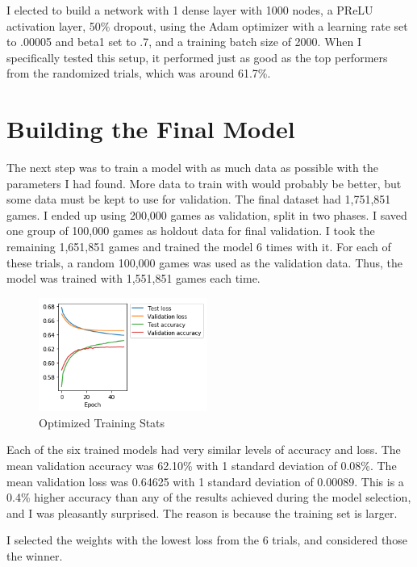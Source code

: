 \documentclass[twoside,twocolumn]{article}
\begin{document}
I elected to build a network with 1 dense layer with 1000 nodes, a PReLU activation layer,  50\% dropout, using the Adam optimizer with a learning rate set to .00005 and beta1 set to .7, and a training batch size of 2000.  When I specifically tested this setup, it performed just as good as the top performers from the randomized trials, which was around 61.7\%.

\section {Building the Final Model}

The next step was to train a model with as much data as possible with the parameters I had found.  More data to train with would probably be better, but some data must be kept to use for validation.  The final dataset had 1,751,851 games.  I ended up using 200,000 games as validation, split in two phases.  I saved one group of 100,000 games as holdout data for final validation.  I took the remaining 1,651,851 games and trained the model 6 times with it.  For each of these trials, a random 100,000 games was used as the validation data.  Thus, the model was trained with 1,551,851 games each time.

\begin{figure}
\caption{Optimized Training Stats}
\label{figure:training}
\begin{adjustbox}{center}
\includegraphics[width=157pt]{training}
\end{adjustbox}
\centering
\end{figure}

Each of the six trained models had very similar levels of accuracy and loss.  The mean validation accuracy was 62.10\% with 1 standard deviation of 0.08\%.  The mean validation loss was  0.64625 with 1 standard deviation of 0.00089.  This is a 0.4\% higher accuracy than any of the results achieved during the model selection, and I was pleasantly surprised.  The reason is because the training set is larger.

I selected the weights with the lowest loss from the 6 trials, and considered those the winner.
\end{document}
